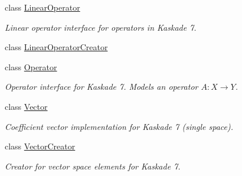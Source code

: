 \begin{DoxyCompactItemize}
class \hyperlink{classSpacy_1_1Kaskade_1_1LinearOperator}{Linear\+Operator}
\begin{DoxyCompactList}\small\item\em Linear operator interface for operators in Kaskade 7. \end{DoxyCompactList}\item 
class \hyperlink{classSpacy_1_1Kaskade_1_1LinearOperatorCreator}{Linear\+Operator\+Creator}
\item 
class \hyperlink{classSpacy_1_1Kaskade_1_1Operator}{Operator}
\begin{DoxyCompactList}\small\item\em Operator interface for Kaskade 7. Models an operator $A:X\rightarrow Y$. \end{DoxyCompactList}\item 
class \hyperlink{classSpacy_1_1Kaskade_1_1Vector}{Vector}
\begin{DoxyCompactList}\small\item\em Coefficient vector implementation for Kaskade 7 (single space). \end{DoxyCompactList}\item 
class \hyperlink{classSpacy_1_1Kaskade_1_1VectorCreator}{Vector\+Creator}
\begin{DoxyCompactList}\small\item\em Creator for vector space elements for Kaskade 7. \end{DoxyCompactList}\end{DoxyCompactItemize}

